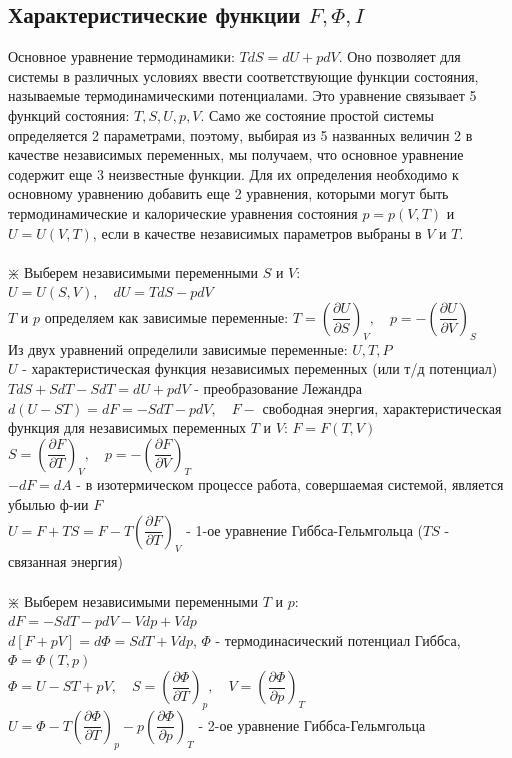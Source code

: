 \begin{multicols*}{2}
		\section{Характеристические функции $F, \Phi, I$}

		Основное уравнение термодинамики: $TdS = dU + pdV$. Оно позволяет для системы в различных условиях ввести соответствующие функции состояния, называемые термодинамическими потенциалами. Это уравнение связывает 5 функций состояния: $T, S, U, p, V$. Само же состояние простой системы определяется 2 параметрами, поэтому, выбирая из 5 названных величин 2 в качестве независимых переменных, мы получаем, что основное уравнение содержит еще 3 неизвестные функции. Для их определения необходимо к основному уравнению добавить еще 2 уравнения, которыми могут быть термодинамические и калорические уравнения состояния $p = p(V, T)$ и $U = U(V, T)$, если в качестве независимых параметров выбраны в $V$ и $T$.\\\\

		$\divideontimes$ Выберем независимыми переменными $S$ и $V$:\\
		$U = U(S,V), \quad dU = TdS - pdV$\\
		$T$ и $p$ определяем как зависимые переменные: $T = \left(\dfrac{\partial U}{\partial S}\right)_V, \quad p = - \left(\dfrac{\partial U}{\partial V}\right)_S$\\
		Из двух уравнений определили зависимые переменные: $U, T, P$\\
		$U$ - характеристическая функция независимых переменных (или т/д потенциал)\\
		$TdS+SdT-SdT = dU+pdV$ - преобразование Лежандра\\
		$d(U-ST) = dF = -SdT - pdV, \quad F -$ свободная энергия, характеристическая функция для независимых переменных $T$ и $V$: $F = F(T, V)$\\
		$S = \left(\dfrac{\partial F}{\partial T}\right)_V, \quad p = - \left(\dfrac{\partial F}{\partial V}\right)_T$\\	
		$-dF = dA$ - в изотермическом процессе работа, совершаемая системой, является убылью ф-ии $F$\\
		$U = F+TS = F-T\left(\dfrac{\partial F}{\partial T}\right)_V$ - 1-ое уравнение Гиббса-Гельмгольца ($TS$ - связанная энергия)\\\\

		$\divideontimes$ Выберем независимыми переменными $T$ и $p$:\\
		$dF = -SdT - pdV - Vdp + Vdp$\\
		$d\left[F + pV\right] = d\Phi = S dT + V dp$, \quad $\Phi$ - термодинасический потенциал Гиббса, \quad $\Phi = \Phi(T, p)$\\
		$\Phi = U-ST+pV, \quad S = \left(\dfrac{\partial \Phi}{\partial T}\right)_p, \quad V = \left(\dfrac{\partial \Phi}{\partial p}\right)_T$\\
		$U = \Phi - T \left(\dfrac{\partial \Phi}{\partial T}\right)_p - p \left(\dfrac{\partial \Phi}{\partial p}\right)_T$ - 2-ое уравнение Гиббса-Гельмгольца\\\\


\end{multicols*}
